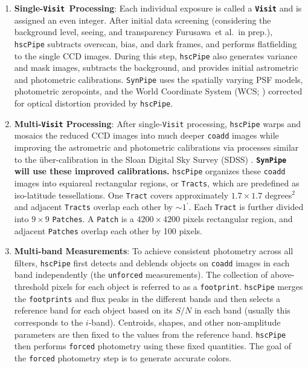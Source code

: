 \documentclass[useamsfonts]{pasj01}
\def\amin{$^\prime$}
\def\etal{{\ et al.~}}
\def\hscpipe{\texttt{hscPipe}}
\def\synpipe{\texttt{SynPipe}}
\def\forced{\texttt{forced}}
\def\coadd{\texttt{coadd}}
\def\unforced{\texttt{unforced}}
\def\tract{\texttt{Tract}}
\def\visit{\texttt{Visit}}
\def\tracts{\texttt{Tracts}}
\newcommand{\term}[1]{\textbf{\texttt{#1}}}
\begin{document}
    \begin{enumerate}

        \item \textbf{Single-\texttt{Visit~}Processing}:
            Each individual exposure is called a \term{Visit} and is assigned
            an even integer.
            After initial data screening (considering the background level, seeing, 
            and transparency Furusawa\etal in prep.), \hscpipe{} subtracts overscan, 
            bias, and dark frames, and performs flatfielding to the single CCD images.
            During this step, \hscpipe{} also generates variance and mask images, 
            subtracts the background, and provides initial astrometric and photometric
            calibrations. 
            \synpipe{} uses the spatially varying PSF models, photometric zeropoints, 
            and the World Coordinate System (WCS; \citealt{WCS1, WCS2})
            corrected for optical distortion provided by \hscpipe{}.
            
        \item \textbf{Multi-\visit{} Processing}:
            After single-\visit{} processing, \hscpipe{} warps and mosaics the
            reduced CCD images into much deeper \coadd{} images while improving
            the astrometric and photometric calibrations via processes similar to
            the \"{u}ber-calibration in the Sloan Digital Sky Survey (SDSS)
            \citep{Padmanabhan2008}.
            \textbf{\synpipe{} will use these improved calibrations.}
            \hscpipe{} organizes these \coadd{} images into equiareal rectangular
            regions, or \tracts{}, which are predefined as iso-latitude tessellations.
            One \tract{} covers approximately $1.7\times 1.7$ degrees$^2$ and
            adjacent \tracts{} overlap each other by ${\sim}1$\amin{}.
            Each \tract{} is further divided into $9\times9$ \texttt{Patches}.
            A \texttt{Patch} is a $4200\times4200$ pixels rectangular region, and
            adjacent \texttt{Patches} overlap each other by 100 pixels.   
            
        \item \textbf{Multi-band Measurements}:
            To achieve consistent photometry across all filters, \hscpipe{} first
            detects and deblends objects on \coadd{} images in each band
            independently (the \unforced{} measurements).
            The collection of above-threshold pixels for each object is referred to as
            a \texttt{footprint}.
            \hscpipe{} merges the \texttt{footprints} and flux peaks in the different
            bands and then selects a reference band for each object based on its $S/N$ 
            in each band (usually this corresponds to the $i$-band).  
            Centroids, shapes, and other non-amplitude parameters are then fixed to  
            the values from the reference band. 
            \hscpipe{} then performs \forced{} photometry using these fixed quantities. 
            The goal of the  \forced{} photometry step is to generate accurate colors.
            

\end{enumerate}
\end{document}

